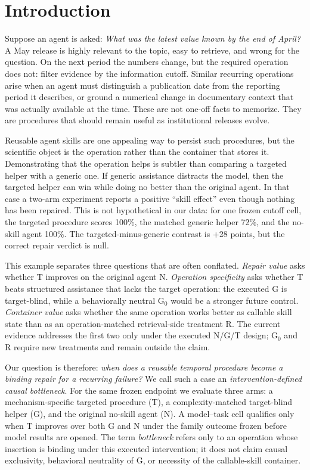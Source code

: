 \section{Introduction}
Suppose an agent is asked: \emph{What was the latest value known by the end of April?} A May release is highly relevant to the topic, easy to retrieve, and wrong for the question. On the next period the numbers change, but the required operation does not: filter evidence by the information cutoff. Similar recurring operations arise when an agent must distinguish a publication date from the reporting period it describes, or ground a numerical change in documentary context that was actually available at the time. These are not one-off facts to memorize. They are procedures that should remain useful as institutional releases evolve.

Reusable agent skills are one appealing way to persist such procedures, but the scientific object is the operation rather than the container that stores it. Demonstrating that the operation helps is subtler than comparing a targeted helper with a generic one. If generic assistance distracts the model, then the targeted helper can win while doing no better than the original agent. In that case a two-arm experiment reports a positive ``skill effect'' even though nothing has been repaired. This is not hypothetical in our data: for one frozen cutoff cell, the targeted procedure scores 100\%, the matched generic helper 72\%, and the no-skill agent 100\%. The targeted-minus-generic contrast is +28 points, but the correct repair verdict is null.

This example separates three questions that are often conflated. \emph{Repair value} asks whether T improves on the original agent N. \emph{Operation specificity} asks whether T beats structured assistance that lacks the target operation: the executed G is target-blind, while a behaviorally neutral G$_0$ would be a stronger future control. \emph{Container value} asks whether the same operation works better as callable skill state than as an operation-matched retrieval-side treatment R. The current evidence addresses the first two only under the executed N/G/T design; G$_0$ and R require new treatments and remain outside the claim.

Our question is therefore: \emph{when does a reusable temporal procedure become a binding repair for a recurring failure?} We call such a case an \emph{intervention-defined causal bottleneck}. For the same frozen endpoint we evaluate three arms: a mechanism-specific targeted procedure (T), a complexity-matched target-blind helper (G), and the original no-skill agent (N). A model--task cell qualifies only when T improves over both G and N under the family outcome frozen before model results are opened. The term \emph{bottleneck} refers only to an operation whose insertion is binding under this executed intervention; it does not claim causal exclusivity, behavioral neutrality of G, or necessity of the callable-skill container.

